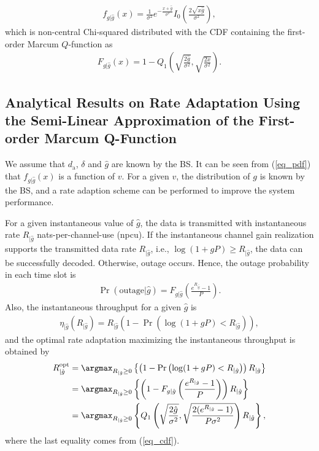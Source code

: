 \begin{align}\label{eq_pdf}
    f_{g|\hat{g}}(x) = \frac{1}{\sigma^2}e^{-\frac{x+\hat{g}}{\sigma^2}}I_0\left(\frac{2\sqrt{x\hat{g}}}{\sigma^2}\right),
\end{align}
which is non-central Chi-squared distributed with the CDF containing the first-order Marcum $Q$-function as
\begin{align}\label{eq_cdf}
    F_{g|\hat{g}}(x) = 1 - Q_1\left( \sqrt{\frac{2\hat{g}}{\sigma^2}}, \sqrt{\frac{2x}{\sigma^2}}  \right).
\end{align}



\subsection{Analytical Results on Rate Adaptation Using the Semi-Linear Approximation of the First-order Marcum Q-Function}\label{In Section III.C}
We assume that $d_\text{a}$, $\delta $ and $\hat{g}$ are known by the BS. It can be seen from (\ref{eq_pdf}) that $f_{g|\hat{g}}(x)$ is a function of $v$. For a given $v$, the distribution of $g$ is known by the BS, and a rate adaption scheme can be performed to improve the system performance.

For a given instantaneous value of $\hat g$, the data is transmitted with instantaneous rate $R_{|\hat{g}}$ nats-per-channel-use (npcu). If the instantaneous channel gain realization supports the transmitted data rate $R_{|\hat{g}}$, i.e., $\log(1+gP)\ge R_{|\hat{g}}$, the data can be successfully decoded. Otherwise,  outage occurs. Hence, the outage probability in each time slot is
\begin{align}
    \Pr(\text{outage}|\hat{g}) = F_{g|\hat{g}}\left(\frac{e^{R_{|\hat{g}}}-1}{P}\right).
\end{align}
Also, the instantaneous throughput for a given $\hat{g}$ is
\begin{align}\label{eq_opteta}
\eta_{|\hat {g}}\left(R_{|\hat{g}}\right)=R_{|\hat{g}}\left(1-\Pr\left(\log(1+gP)<R_{|\hat{g}}\right)\right),
\end{align}
and the optimal rate adaptation maximizing the  instantaneous throughput is obtained by
\begin{align}\label{eq_optR}
    R_{|\hat{g}}^{\text{opt}}&=\argmax_{R_{|\hat{g}}\geq 0} \left\{ \left(1-\Pr\left(\log(1+gP)<R_{|\hat{g}}\right)\right)R_{|\hat{g}} \right\}\nonumber\\
    &=\argmax_{R_{|\hat{g}}\geq 0} \left\{ \left(1-F_{g|\hat{g}}\left(\frac{e^{R_{|\hat{g}}}-1}{P}\right)\right) R_{|\hat{g}}\right\}\nonumber\\
    &=\argmax_{R_{|\hat{g}}\geq 0} \left\{ Q_1\left(  \sqrt{\frac{2\hat{g}}{\sigma^2}}, \sqrt{\frac{2(e^{R_{|\hat{g}}}-1)}{P\sigma^2}} \right)R_{|\hat{g}} \right\},
\end{align}
where the last equality comes from (\ref{eq_cdf}). 

